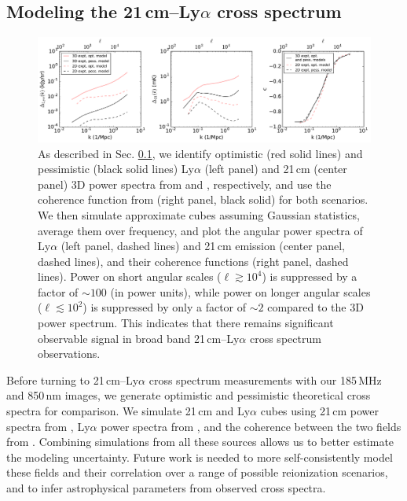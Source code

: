 \documentclass[numberedappendix]{emulateapj}
\begin{document}
\subsection{Modeling the 21\,cm--Ly$\alpha$ cross spectrum}
\label{sec:modelingthecrossspectrum}

\begin{figure}[h]
\centering
\includegraphics[width=7in]{spectra3D_to_2D.pdf}
\caption[Study of the relationship between power spectra recovered from 2D and 3D surveys, both for 21\,cm and 850\,nm cubes.]{As described in Sec. \ref{sec:modelingthecrossspectrum}, we identify optimistic (red solid lines) and pessimistic (black solid lines) Ly$\alpha$ (left panel) and 21\,cm (center panel) 3D power spectra from \citet{Gong2014} and \citet{PoberNextGen, 21cmfast}, respectively, and use the coherence function from \citet{Heneka2016} (right panel, black solid) for both scenarios. We then simulate approximate cubes assuming Gaussian statistics, average them over frequency, and plot the angular power spectra of Ly$\alpha$ (left panel, dashed lines) and 21\,cm emission (center panel, dashed lines), and their coherence functions (right panel, dashed lines). Power on short angular scales ($\ell\gtrsim10^4$) is suppressed by a factor of $\sim100$ (in power units), while power on longer angular scales ($\ell\lesssim10^2$) is suppressed by only a factor of $\sim2$ compared to the 3D power spectrum. This indicates that there remains significant observable signal in broad band 21\,cm--Ly$\alpha$ cross spectrum observations. }
\label{fig:spectra3Dto2D}
\end{figure}

Before turning to 21\,cm--Ly$\alpha$ cross spectrum measurements with our 185\,MHz and 850\,nm images, we generate optimistic and pessimistic theoretical cross spectra for comparison. We simulate 21\,cm and Ly$\alpha$ cubes using 21\,cm power spectra from \citet{PoberNextGen}, Ly$\alpha$ power spectra from \citet{Gong2014}, and the coherence between the two fields from \citet{Heneka2016}. Combining simulations from all these sources allows us to better estimate the modeling uncertainty. Future work is needed to more self-consistently model these fields and their correlation over a range of possible reionization scenarios, and to infer astrophysical parameters from observed cross spectra.
\end{document}
